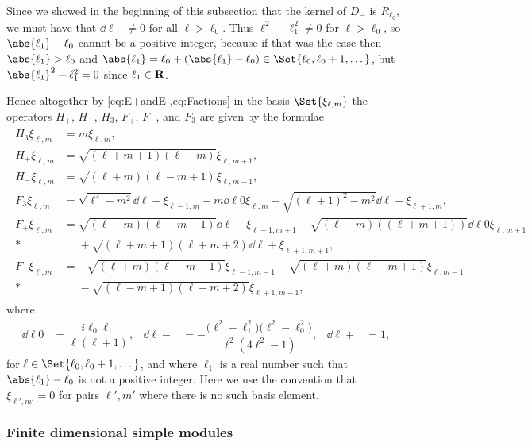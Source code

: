 Since we showed in the beginning of this subsection that the kernel of $D_-$ is $R_{\ell_0}$, we must have that $\dd{\ell}{-}\neq 0$ for all $\ell>\ell_0$. Thus $\ell^2-\ell_1^2\neq 0$ for $\ell>\ell_0$, so $\abs{\ell_1}-\ell_0$ cannot be a positive integer, because if that was the case then $\abs{\ell_1}>\ell_0$ and $\abs{\ell_1}= \ell_0+(\abs{\ell_1}-\ell_0) \in \Set{\ell_0,\ell_0+1,\dotsc}$, but $\abs{\ell_1}^2-\ell_1^2=0$ since $\ell_1\in\mathbf{R}$. 

Hence altogether by \cref{eq:E+andE-,eq:Factions} in the basis $\Set{\xi_{\ell,m}}$ the operators $H_+$, $H_-$, $H_3$, $F_+$, $F_-$, and $F_3$ are given by the formulae
\begin{align}\label{eq:infdimactions}
  \begin{aligned}
    H_3\xi_{\ell,m} &= m\xi_{\ell,m}, \\
    H_+\xi_{\ell,m} &= \sqrt{(\ell+m+1)(\ell-m)} \xi_{\ell,m+1}, \\
    H_-\xi_{\ell,m} &= \sqrt{(\ell+m)(\ell-m+1)} \xi_{\ell,m-1}, \\
    F_3\xi_{\ell,m} &= \sqrt{\ell^2-m^2} \dd{\ell}{-}\xi_{\ell-1,m} - m \dd{\ell}{0}\xi_{\ell,m} - \sqrt{(\ell+1)^2-m^2}\dd{\ell}{+}\xi_{\ell+1,m}, \\
    F_+\xi_{\ell,m} &= \sqrt{(\ell-m)(\ell-m-1)}\dd{\ell}{-}\xi_{\ell-1,m+1} - \sqrt{(\ell-m)((\ell+m+1))}\dd{\ell}{0}\xi_{\ell,m+1} \\*
    &\phantom{{}={}}{} + \sqrt{(\ell+m+1)(\ell+m+2)} \dd{\ell}{+}\xi_{\ell+1,m+1}, \\
    F_-\xi_{\ell,m} &= -\sqrt{(\ell+m)(\ell+m-1)}\xi_{\ell-1,m-1} - \sqrt{(\ell+m)(\ell-m+1)}\xi_{\ell,m-1} \\*
    &\phantom{{}={}}{} - \sqrt{(\ell-m+1)(\ell-m+2)}\xi_{\ell+1,m-1},
  \end{aligned}
\end{align}
where
\begin{align}\label{eq:infdimds}
  \dd{\ell}{0} &= \dfrac{i\ell_0\ell_1}{\ell(\ell+1)}, & \dd{\ell}{-} &= -\dfrac{\bigl(\ell^2 - \ell_1^2\bigr)\bigl( \ell^2 - \ell_0^2 \bigr)}{\ell^2(4\ell^2-1)}, & \dd{\ell}{+} &= 1,
\end{align}
for $\ell\in\Set{\ell_0,\ell_0+1,\dotsc}$, and where $\ell_1$ is a real number such that $\abs{\ell_1}-\ell_0$ is not a positive integer. Here we use the convention that $\xi_{\ell',m'}=0$ for pairs $\ell',m'$ where there is no such basis element.

\subsubsection{Finite dimensional simple modules}

